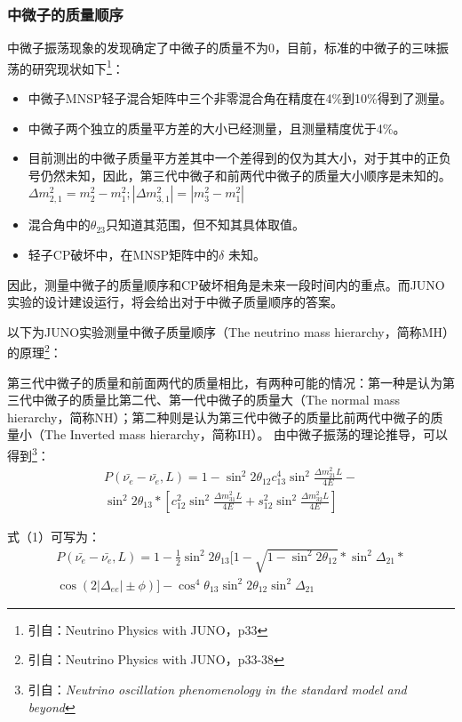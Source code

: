 \documentclass[15pt,a4paper]{article}
\begin{document}
\subsubsection{中微子的质量顺序}\label{sub:sysover}
中微子振荡现象的发现确定了中微子的质量不为0，目前，标准的中微子的三味振荡的研究现状如下{\footnote{引自：Neutrino Physics with JUNO，p33}}：
\begin{itemize}
	\item{中微子MNSP轻子混合矩阵中三个非零混合角在精度在4\%到10\%得到了测量。}
    \item{中微子两个独立的质量平方差的大小已经测量，且测量精度优于4\%。}
    \item{目前测出的中微子质量平方差其中一个差得到的仅为其大小，对于其中的正负号仍然未知，因此，第三代中微子和前两代中微子的质量大小顺序是未知的。$\Delta m_{2,1}^2=m_{2}^2-m_{1}^2;|\Delta m_{3,1}^2|=|m_{3}^2-m_{1}^2|$}
    \item{混合角中的$\theta_{23}$只知道其范围，但不知其具体取值。}
    \item{轻子CP破坏中，在MNSP矩阵中的$\delta$ 未知。}
\end{itemize}

因此，测量中微子的质量顺序和CP破坏相角是未来一段时间内的重点。而JUNO实验的设计建设运行，将会给出对于中微子质量顺序的答案。

以下为JUNO实验测量中微子质量顺序（The neutrino mass hierarchy，简称MH）的原理{\footnote{引自：Neutrino Physics with JUNO，p33-38}}：

第三代中微子的质量和前面两代的质量相比，有两种可能的情况：第一种是认为第三代中微子的质量比第二代、第一代中微子的质量大（The normal mass hierarchy，简称NH）；第二种则是认为第三代中微子的质量比前两代中微子的质量小（The Inverted mass hierarchy，简称IH）。
由中微子振荡的理论推导，可以得到\footnote{引自：\itshape{Neutrino oscillation phenomenology  in the standard model and beyond}  }：
 \begin{equation}
 \begin{split}
    \label{E1}
     P(\bar{\nu_e}-\bar{\nu_e},L)=1-{\sin^2{2\theta_{12}}} c_{13}^4\sin^2{\frac{\Delta{m_{21}^2}L}{4E}}-\\
\sin^2{2\theta_{13}} *[c_{12}^2\sin^2{\frac{\Delta{m_{31}^2}L}{4E}}+s_{12}^2\sin^2{\frac{\Delta{m_{32}^2}L}{4E}}]
 \end{split}
 \end{equation}

式（1）可写为：
 \begin{equation}
 \begin{split}
    \label{E1}
     P(\bar{\nu_e}-\bar{\nu_e},L)=1-\frac{1}{2}{\sin^2{2\theta_{13}}}[1-\sqrt{1-\sin^2{2\theta_{12}}}*\sin^2{\Delta_{21}}*\\\cos(2|\Delta_{ee}|\pm\phi)] -\cos^4{\theta_{13}}\sin^2{2\theta_{12}}\sin^2{\Delta_{21}} 
 \end{split}
 \end{equation}
\end{document}
